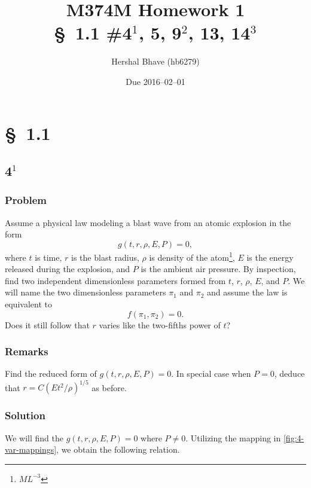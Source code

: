 \documentclass[12pt]{article}
\title{M374M Homework 1 \\
  \normalsize{\S~1.1 \#4$^1$, 5, 9$^2$, 13, 14$^3$}}
\author{Hershal Bhave (hb6279)}
\date{Due 2016--02--01}
\begin{document}
\maketitle

\section{\S~1.1}
\subsection{4$^1$}
  \subsubsection*{Problem}
  Assume a physical law modeling a blast wave from an atomic explosion in the
  form
  \begin{equation*}
    g(t,r,\rho,E,P)=0,
  \end{equation*}
  where $t$ is time, $r$ is the blast radius, $\rho$ is density of the
  atom\footnote{$ML^{-3}$}, $E$ is the energy released during the explosion, and
  $P$ is the ambient air pressure. By inspection, find two independent
  dimensionless parameters formed from $t$, $r$, $\rho$, $E$, and $P$. We will
  name the two dimensionless parameters $\pi_1$ and $\pi_2$ and assume the law
  is equivalent to
  \begin{equation*}
    f(\pi_1,\pi_2)=0.
  \end{equation*}
  Does it still follow that $r$ varies like the two-fifths power of $t$?

  \subsubsection*{Remarks}
  Find the reduced form of $g(t,r,\rho,E,P)=0$. In special case when $P=0$,
  deduce that $r=C{(Et^2/\rho)}^{1/5}$ as before.

  \subsubsection*{Solution}
  We will find the $g(t,r,\rho,E,P)=0$ where $P\ne0$. Utilizing the mapping in
  \cref{fig:4-var-mappings}, we obtain the following relation.
\end{document}
